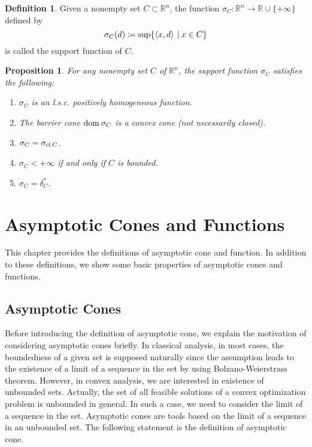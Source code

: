 \documentclass[a4paper,11pt, oneside]{book}
\newtheorem{prop}[thm]{Proposition}
\theoremstyle{definition}
\newtheorem{dfn}[thm]{Definition}
\newcommand{\RealNumberSet}{\mathbb{R}}
\newcommand{\NDemenstionalRealEuclideanSpace}{\mathbb{R}^n}
\newcommand{\Closure}[1]{\text{\rm cl\:${#1}$}} %
\newcommand{\Domain}[1]{\text{\rm dom\:${#1}$}} %
\newcommand{\InnerProduct}[2]{\left\langle {#1},{#2}\right\rangle} %
\newcommand{\ExtendedRealValuedFunction}[2]{{#1}: {#2} \to \RealNumberSet \cup \{+\infty\}}
\newcommand{\SupportFunction}[1]{\sigma_{#1}}
\newcommand{\IndicatorFunction}[1]{\delta_{#1}}
\begin{document}
\begin{dfn}
  Given a nonempty set $C \subset \NDemenstionalRealEuclideanSpace$, the function $\ExtendedRealValuedFunction{\sigma_C}{\NDemenstionalRealEuclideanSpace}$ defined by
  \begin{equation}
    \sigma_C (d) \coloneqq \sup\{\InnerProduct{x}{d} \:|\: x \in C\} \notag
  \end{equation}
  is called the support function of $C$.
\end{dfn}

\begin{prop}\label{basicPropositionOfSupportFunctions}
  For any nonempty set $C$ of $\NDemenstionalRealEuclideanSpace$, the support function $\SupportFunction{C}$ satisfies the following:
  \begin{enumerate}[label=\roman*,align=CenterWithParen]
    \item $\SupportFunction{C}$ is an l.s.c. positively homogeneous function.
    \item The barrier cone $\Domain{\SupportFunction{C}}$ is a convex cone (not necessarily closed).
    \item $\SupportFunction{C} = \SupportFunction{\Closure{C}}$.
    \item $\SupportFunction{C} < +\infty$ if and only if $C$ is bounded.
    \item $\SupportFunction{C} = \IndicatorFunction{C}^*$.
  \end{enumerate}
\end{prop}

\chapter{Asymptotic Cones and Functions}

This chapter provides the definitions of asymptotic cone and function. In addition to these definitions, we show some basic properties of asymptotic cones and functions.

\section{Asymptotic Cones}

Before introducing the definition of asymptotic cone, we explain the motivation of considering asymptotic cones briefly. In classical analysis, in most cases, the boundedness of a given set is supposed naturally since the assumption leads to the existence of a limit of a sequence in the set by using Bolzano-Weierstrass theorem. However, in convex analysis, we are interested in existence of unbounded sets. Actually, the set of all feasible solutions of a convex optimization problem is unbounded in general. In such a case, we need to consider the limit of a sequence in the set. Asymptotic cones are tools based on the limit of a sequence in an unbounded set.
The following statement is the definition of asymptotic cone.
\end{document}
